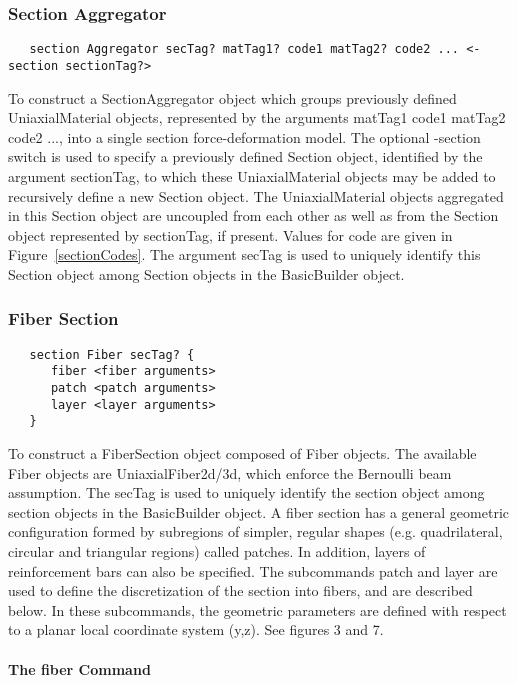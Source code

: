 \documentclass[12pt]{article}
\begin{document}
\subsubsection{Section Aggregator}
{\sf\small
\begin{verbatim}
   section Aggregator secTag? matTag1? code1 matTag2? code2 ... <-section sectionTag?>
\end{verbatim}
}

To construct a SectionAggregator object which groups
previously defined UniaxialMaterial objects, represented by the
arguments matTag1 code1 matTag2 code2 ..., into a single section
force-deformation model. The optional -section switch is used to
specify a previously defined Section object, identified by the
argument sectionTag, to which these UniaxialMaterial objects may be
added to recursively define a new Section object. The UniaxialMaterial
objects aggregated in this Section object are uncoupled from each
other as well as from the Section object represented by sectionTag, if
present. Values for code are given in Figure~\ref{sectionCodes}. The
argument secTag is used to uniquely identify this Section object among
Section objects in the BasicBuilder object. 

\subsubsection{Fiber Section}
{\sf\small
\begin{verbatim}
   section Fiber secTag? {
      fiber <fiber arguments>
      patch <patch arguments>
      layer <layer arguments>
   }
\end{verbatim}
}


\noindent To construct a FiberSection object composed of Fiber objects.
The available Fiber objects are UniaxialFiber2d/3d, which enforce the
Bernoulli beam assumption. The secTag is used to uniquely identify the 
section object among section objects in the BasicBuilder object. A fiber 
section has a general geometric configuration formed by subregions
of simpler, regular shapes (e.g. quadrilateral, circular and triangular
regions) called patches. In addition, layers of reinforcement bars 
can also be specified. The subcommands patch and layer are used to
define the discretization of the section into
fibers, and are described below. In these subcommands, the geometric
parameters are defined with respect to a planar local coordinate system (y,z). 
See figures 3 and 7.

\paragraph{The fiber Command}
\end{document}
